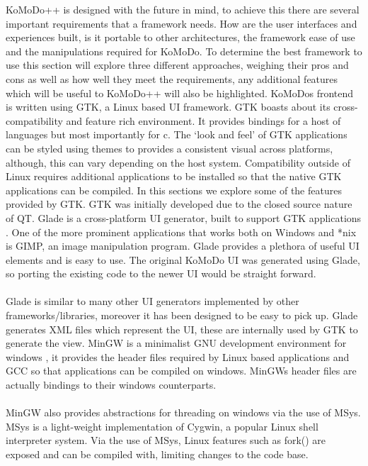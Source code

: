 \graphicspath{ {images/research/} }
%
KoMoDo++ is designed with the future in mind, to achieve this there are several important requirements that a framework needs. How are the user interfaces and experiences built, is it portable to other architectures, the framework ease of use and the manipulations required for KoMoDo. To determine the best framework to use this section will explore three different approaches, weighing their pros and cons as well as how well they meet the requirements, any additional features which will be useful to KoMoDo++ will also be highlighted.
%
KoMoDos frontend is written using GTK, a Linux based UI framework. GTK boasts about its cross-compatibility and feature rich environment\cite{gtk}. It provides bindings for a host of languages but most importantly for c. The  `look and feel' of GTK applications can be styled using themes to provides a consistent visual across platforms, although, this can vary depending on the host system. Compatibility outside of Linux requires additional applications to be installed so that the native GTK applications can be compiled. In this sections we explore some of the features provided by GTK. GTK was initially developed due to the closed source nature of QT.
  Glade is a cross-platform UI generator, built to support GTK applications \cite{glade}. One of the more prominent applications that works both on Windows and *nix is GIMP, an image manipulation program. Glade provides a plethora of useful UI elements and is easy to use. The original KoMoDo UI was generated using Glade, so porting the existing code to the newer UI would be straight forward.\\\\
  Glade is similar to many other UI generators implemented by other frameworks/libraries, moreover it has been designed to be easy to pick up. Glade generates XML files which represent the UI, these are internally used by GTK to generate the view.
  MinGW is a minimalist GNU development environment for windows \cite{mingw}, it provides the header files required by Linux based applications and GCC so that applications can be compiled on windows. MinGWs header files are actually bindings to their windows counterparts.\\\\
  MinGW also provides abstractions for threading on windows via the use of MSys\cite{msys}. MSys is a light-weight implementation of Cygwin, a popular Linux shell interpreter system. Via the use of MSys, Linux features such as fork() are exposed and can be compiled with, limiting changes to the code base.
